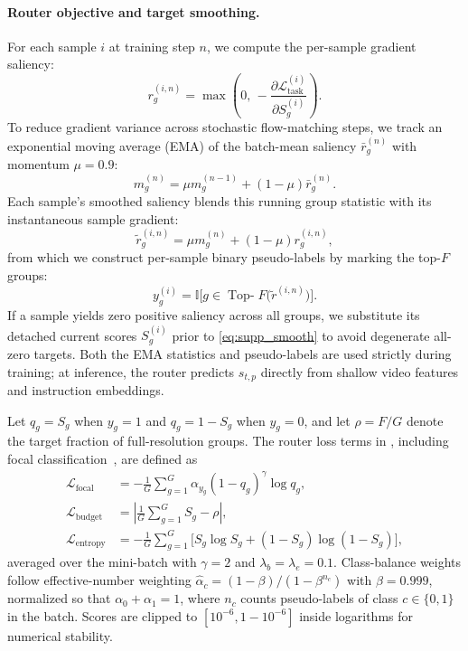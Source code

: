 \paragraph{Router objective and target smoothing.}
    For each sample $i$ at training step $n$, we compute the per-sample gradient saliency:
    \begin{equation}
        r_g^{(i,n)} = \max\!\left(0,\, -\frac{\partial \mathcal{L}_{\text{task}}^{(i)}}{\partial S_g^{(i)}}\right).
        \label{eq:supp_saliency}
    \end{equation}
    To reduce gradient variance across stochastic flow-matching steps, we track an exponential moving average (EMA) of the batch-mean saliency $\bar{r}_g^{(n)}$ with momentum $\mu = 0.9$:
    \begin{equation}
        m_g^{(n)} = \mu m_g^{(n-1)} + (1 - \mu)\bar{r}_g^{(n)}.
        \label{eq:supp_ema}
    \end{equation}
    Each sample's smoothed saliency blends this running group statistic with its instantaneous sample gradient:
    \begin{equation}
        \tilde{r}_g^{(i,n)} = \mu m_g^{(n)} + (1 - \mu) r_g^{(i,n)},
        \label{eq:supp_smooth}
    \end{equation}
    from which we construct per-sample binary pseudo-labels by marking the top-$F$ groups:
    \begin{equation}
        y_g^{(i)} = \mathbb{I}\!\big[g \in \operatorname{Top-}F\big(\tilde{r}^{(i,n)}\big)\big].
        \label{eq:supp_pseudolabel}
    \end{equation}
    If a sample yields zero positive saliency across all groups, we substitute its detached current scores $S_g^{(i)}$ prior to \cref{eq:supp_smooth} to avoid degenerate all-zero targets.
    Both the EMA statistics and pseudo-labels are used strictly during training; at inference, the router predicts $s_{t,p}$ directly from shallow video features and instruction embeddings.


    Let $q_g = S_g$ when $y_g = 1$ and $q_g = 1 - S_g$ when $y_g = 0$, and let $\rho = F / G$ denote the target fraction of full-resolution groups.
    The router loss terms in , including focal classification~\cite{lin2017focal}, are defined as
    \begin{align}
        \mathcal{L}_{\text{focal}} &= -\frac{1}{G} \sum_{g=1}^{G} \alpha_{y_g} (1 - q_g)^{\gamma} \log q_g, \label{eq:supp_focal} \\
        \mathcal{L}_{\text{budget}} &= \left| \frac{1}{G} \sum_{g=1}^{G} S_g - \rho \right|, \label{eq:supp_budget} \\
        \mathcal{L}_{\text{entropy}} &= -\frac{1}{G} \sum_{g=1}^{G} \big[ S_g \log S_g + (1 - S_g) \log(1 - S_g) \big], \label{eq:supp_entropy}
    \end{align}
    averaged over the mini-batch with $\gamma = 2$ and $\lambda_b = \lambda_e = 0.1$.
    Class-balance weights follow effective-number weighting $\hat{\alpha}_c = (1 - \beta)/(1 - \beta^{n_c})$ with $\beta = 0.999$, normalized so that $\alpha_0 + \alpha_1 = 1$, where $n_c$ counts pseudo-labels of class $c \in \{0, 1\}$ in the batch.
    Scores are clipped to $[10^{-6}, 1 - 10^{-6}]$ inside logarithms for numerical stability.


